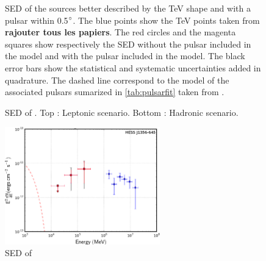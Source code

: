 \begin{figure}[h!]
\caption{\label{fig:sedsourcespuls3}SED of the sources better described by the TeV shape and with a pulsar within 0.5$\mbox{$^\circ$}$. The blue points show the TeV points taken from \textbf{rajouter tous les papiers}. The red circles and the magenta squares show respectively the SED without the pulsar included in the model and with the pulsar included in the model. The black error bars show the statistical and   systematic uncertainties added in quadrature. The dashed line correspond to the model of the associated pulsars sumarized in \ref{tab:pulsarfit} taken from \cite{2012ApJS..199...31N}.}
\end{figure}

\begin{figure}[h!]
\centering
{}
\caption{SED of . Top : Leptonic scenario. Bottom : Hadronic scenario. 
}
\end{figure}

\begin{figure}[h!]
\centering
\includegraphics[width=0.60\textwidth]{figures/HESSJ1356.eps}
\caption{SED of
\label{fig:hess1356}}
\end{figure}

